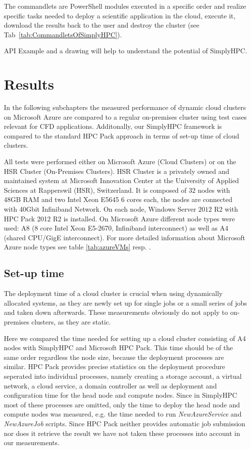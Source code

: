 \documentclass[3p,times]{elsarticle}
\begin{document}
The commandlets are PowerShell modules executed in a specific order and realize specific tasks needed to deploy a scientific application in the cloud, execute it, download the results back to the user and destroy the cluster (see Tab~\ref{tab:CommandletsOfSimplyHPC}).  

\textcolor[rgb]{1,0,0}{API Example and a drawing will help to understand the potential of SimplyHPC.}

\section{Results}
\label{sec:results}
In the following subchapters the measured performance of dynamic cloud clusters on Microsoft Azure are compared to a regular on-premises cluster using test cases relevant for CFD applications. Additonally, our SimplyHPC framework is compared to the standard HPC Pack approach in terms of set-up time of cloud clusters.

All tests were performed either on Microsoft Azure (Cloud Clusters) or on the HSR Cluster (On-Premises Clusters). HSR Cluster is a privately owned and maintained system at Microsoft Innovation Center at the University of Applied Sciences at Rapperswil (HSR), Switzerland. It is composed of $32$ nodes with 48GB RAM and two Intel Xeon E5645 6 cores each, the nodes are connected with 40Gbit Infiniband Network. On each node, Windows Server $2012$ R2 with HPC Pack 2012 R2 is installed.
On Microsoft Azure different node types were used: A8 (8 core Intel Xeon E5-2670, Infiniband interconnect) as well as A4 (shared CPU/GigE interconnect). For more detailed information about Microsoft Azure node types see table \ref{tab:azureVMs} resp. \cite{azure}.

\subsection{Set-up time}
The deployment time of a cloud cluster is crucial when using dynamically allocated systems, as they are newly set up for single jobs or a small series of jobs and taken down afterwards. These measurements obviously do not apply to on-premises clusters, as they are static.

Here we compared the time needed for setting up a cloud cluster consisting of A4 nodes with SimplyHPC and Microsoft HPC Pack. This time should be of the same order regardless the node size, because the deployment processes are similar. HPC Pack provides precise statistics on the deployment procedure seperated into individual processes, namely creating a storage account, a virtual network, a cloud service, a domain controller as well as deployment and configuration time for the head node and compute nodes. Since in SimplyHPC most of these processes are omitted, only the time to deploy the head node and compute nodes was measured, e.g. the time needed to run \textit{NewAzureService} and \textit{NewAzureJob} scripts. Since HPC Pack neither provides automatic job submission nor does it retrieve the result we have not taken these processes into account in our measurements. 
\end{document}
